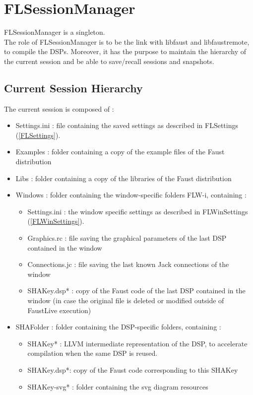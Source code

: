 \documentclass[a4paper]{article}
\begin{document}
\section{FLSessionManager}

FLSessionManager is a singleton.\\
The role of FLSessionManager is to be the link with libfaust and libfaustremote, to compile the DSPs. Moreover, it has the purpose to maintain the hierarchy of the current session and be able to save/recall sessions and snapshots. 

\subsection{Current Session Hierarchy}

The current session is composed of : 
\begin{itemize}
\item Settings.ini : file containing the saved settings as described in FLSettings (\ref{FLSettings}).
\item Examples : folder containing a copy of the example files of the Faust distribution
\item Libs : folder containing a copy of the libraries of the Faust distribution
\item Windows : folder containing the window-specific folders FLW-i, containing :
	\begin{itemize}
		\item Settings.ini : the window specific settings as described in FLWinSettings (\ref{FLWinSettings}).
		\item Graphics.rc : file saving the graphical parameters of the last DSP contained in the window
		\item Connections.jc : file saving the last known Jack connections of the window
		\item SHAKey.dsp* : copy of the Faust code of the last DSP contained in the window (in case the original file is deleted or modified outside of FaustLive execution)
	\end{itemize}
\item SHAFolder : folder containing the DSP-specific folders, containing : 
	\begin{itemize}
		\item SHAKey* : LLVM intermediate representation of the DSP, to accelerate compilation when the same DSP is reused.
		\item SHAKey.dsp*: copy of the Faust code corresponding to this SHAKey
		\item SHAKey-svg* : folder containing the svg diagram resources
	\end{itemize}
\end{itemize}
\end{document}
